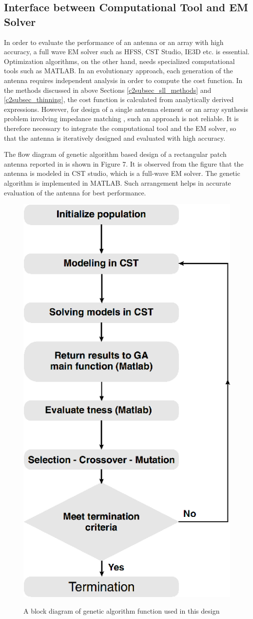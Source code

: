 \subsection{Interface between Computational Tool and EM Solver} \label{c2subsec_tools}
In order to evaluate the performance of an antenna or an array with high accuracy, a full wave EM solver such as HFSS, CST Studio, IE3D etc. is essential. Optimization algorithms, on the other hand, needs specialized computational tools such as MATLAB. In an evolutionary approach, each generation of the antenna requires independent analysis in order to compute the cost function. In the methods discussed in above Sections \ref{c2subsec_sll_methods} and \ref{c2subsec_thinning}, the cost function is calculated from analytically derived expressions. However, for design of a single antenna element \cite{patch_miniaturize_ga, optPatch, freqReconfCogn} or an array synthesis problem involving impedance matching \cite{arraySynth1}, such an approach is not reliable. It is therefore necessary to integrate the computational tool and the EM solver, so that the antenna is iteratively designed and evaluated with high accuracy.

The flow diagram of genetic algorithm based design of a rectangular patch antenna reported in \cite{patch_miniaturize_ga} is shown in Figure 7. It is observed from the figure that the antenna is modeled in CST studio, which is a full-wave EM solver. The genetic algorithm is implemented in MATLAB. Such arrangement helps in accurate evaluation of the antenna for best performance.

\begin{figure}
  \centering
  \includegraphics[width=0.4\linewidth]{fig_2_7.eps}\\
  \caption{A block diagram of genetic algorithm function used in this design \cite{patch_miniaturize_ga}} \label{fig_2_7}
\end{figure}

